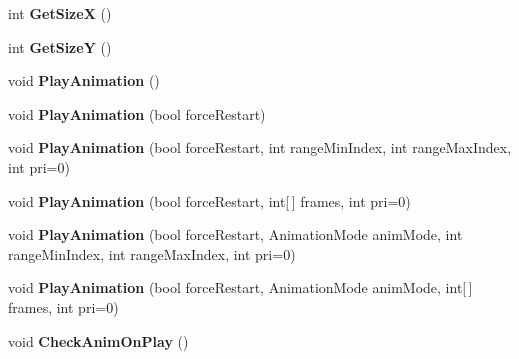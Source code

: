 \begin{DoxyCompactItemize}
\item 
\hypertarget{class_rage_pixel_sprite_ac506ca3a0d23206f0001e5cefd798863}{int {\bfseries Get\-Size\-X} ()}\label{class_rage_pixel_sprite_ac506ca3a0d23206f0001e5cefd798863}

\item 
\hypertarget{class_rage_pixel_sprite_a5a63873e353ef9291a5f265e4e3baff0}{int {\bfseries Get\-Size\-Y} ()}\label{class_rage_pixel_sprite_a5a63873e353ef9291a5f265e4e3baff0}

\item 
\hypertarget{class_rage_pixel_sprite_ae557b68f6e00fe1db13c875eaf02b1ac}{void {\bfseries Play\-Animation} ()}\label{class_rage_pixel_sprite_ae557b68f6e00fe1db13c875eaf02b1ac}

\item 
\hypertarget{class_rage_pixel_sprite_ad4ec1d4f93bbc698c67469baf5c3ec2e}{void {\bfseries Play\-Animation} (bool force\-Restart)}\label{class_rage_pixel_sprite_ad4ec1d4f93bbc698c67469baf5c3ec2e}

\item 
\hypertarget{class_rage_pixel_sprite_a5187d2f5a02e4a22b05cdc2f630f2f4c}{void {\bfseries Play\-Animation} (bool force\-Restart, int range\-Min\-Index, int range\-Max\-Index, int pri=0)}\label{class_rage_pixel_sprite_a5187d2f5a02e4a22b05cdc2f630f2f4c}

\item 
\hypertarget{class_rage_pixel_sprite_a2afe47975aca01efb29dcca92053baea}{void {\bfseries Play\-Animation} (bool force\-Restart, int\mbox{[}$\,$\mbox{]} frames, int pri=0)}\label{class_rage_pixel_sprite_a2afe47975aca01efb29dcca92053baea}

\item 
\hypertarget{class_rage_pixel_sprite_af8fdce57834b01a7b7b9f89a2c559455}{void {\bfseries Play\-Animation} (bool force\-Restart, Animation\-Mode anim\-Mode, int range\-Min\-Index, int range\-Max\-Index, int pri=0)}\label{class_rage_pixel_sprite_af8fdce57834b01a7b7b9f89a2c559455}

\item 
\hypertarget{class_rage_pixel_sprite_a72d3d3695e99a5c19703c17efe2d8b54}{void {\bfseries Play\-Animation} (bool force\-Restart, Animation\-Mode anim\-Mode, int\mbox{[}$\,$\mbox{]} frames, int pri=0)}\label{class_rage_pixel_sprite_a72d3d3695e99a5c19703c17efe2d8b54}

\item 
\hypertarget{class_rage_pixel_sprite_a870af117bb9a63e9e6b6c5c4587d84e3}{void {\bfseries Check\-Anim\-On\-Play} ()}\label{class_rage_pixel_sprite_a870af117bb9a63e9e6b6c5c4587d84e3}


\end{DoxyCompactItemize}
